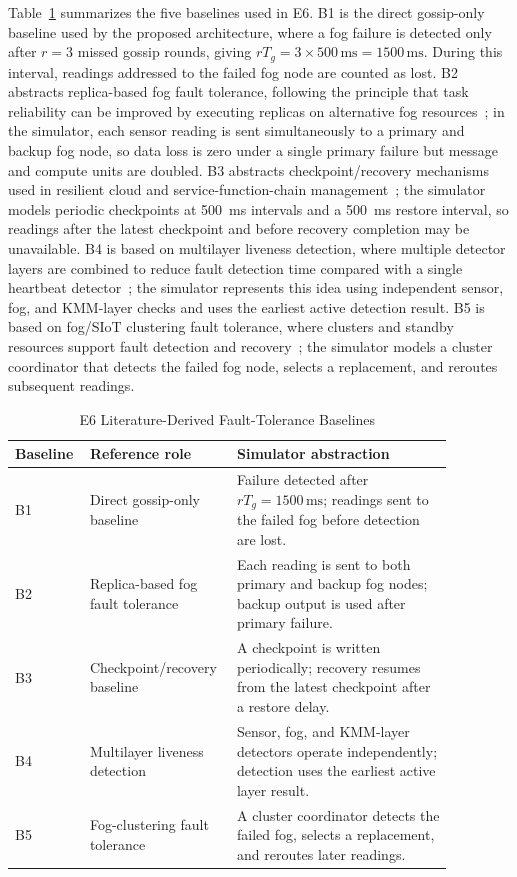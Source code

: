 \documentclass[conference]{IEEEtran}
\begin{document}
    Table~\ref{tab:e6-baselines} summarizes the five baselines used in E6. B1 is the direct gossip-only baseline used by the proposed architecture, where a fog failure is detected only after $r{=}3$ missed gossip rounds, giving $rT_g=3\times500\,\text{ms}=1500\,\text{ms}$. During this interval, readings addressed to the failed fog node are counted as lost. B2 abstracts replica-based fog fault tolerance, following the principle that task reliability can be improved by executing replicas on alternative fog resources~\cite{liu2024replica}; in the simulator, each sensor reading is sent simultaneously to a primary and backup fog node, so data loss is zero under a single primary failure but message and compute units are doubled. B3 abstracts checkpoint/recovery mechanisms used in resilient cloud and service-function-chain management~\cite{shahab2025sfc}; the simulator models periodic checkpoints at 500~ms intervals and a 500~ms restore interval, so readings after the latest checkpoint and before recovery completion may be unavailable. B4 is based on multilayer liveness detection, where multiple detector layers are combined to reduce fault detection time compared with a single heartbeat detector~\cite{lee2022multilayer}; the simulator represents this idea using independent sensor, fog, and KMM-layer checks and uses the earliest active detection result. B5 is based on fog/SIoT clustering fault tolerance, where clusters and standby resources support fault detection and recovery~\cite{mohammadi2023fsiot}; the simulator models a cluster coordinator that detects the failed fog node, selects a replacement, and reroutes subsequent readings.

    \begin{table}[htbp]
    \centering
    \caption{E6 Literature-Derived Fault-Tolerance Baselines}
    \label{tab:e6-baselines}
    \begin{tabular}{p{0.12\linewidth}p{0.28\linewidth}p{0.47\linewidth}}
    \toprule
    Baseline & Reference role & Simulator abstraction \\
    \midrule
    B1 & Direct gossip-only baseline & Failure detected after $rT_g=1500\,\text{ms}$; readings sent to the failed fog before detection are lost. \\
    B2 & Replica-based fog fault tolerance~\cite{liu2024replica} & Each reading is sent to both primary and backup fog nodes; backup output is used after primary failure. \\
    B3 & Checkpoint/recovery baseline~\cite{shahab2025sfc} & A checkpoint is written periodically; recovery resumes from the latest checkpoint after a restore delay. \\
    B4 & Multilayer liveness detection~\cite{lee2022multilayer} & Sensor, fog, and KMM-layer detectors operate independently; detection uses the earliest active layer result. \\
    B5 & Fog-clustering fault tolerance~\cite{mohammadi2023fsiot} & A cluster coordinator detects the failed fog, selects a replacement, and reroutes later readings. \\
    \bottomrule
    \end{tabular}
    \end{table}
\end{document}
